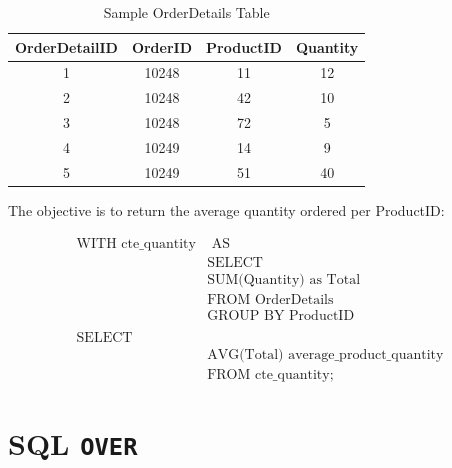 \documentclass{article}
\begin{document}
\begin{table}[h]
    \centering
    \begin{tabular}{|c|c|c|c|}
        \hline
        OrderDetailID & OrderID & ProductID & Quantity \\
        \hline
        1             & 10248   & 11        & 12       \\
        2             & 10248   & 42        & 10       \\
        3             & 10248   & 72        & 5        \\
        4             & 10249   & 14        & 9        \\
        5             & 10249   & 51        & 40       \\
        \hline
    \end{tabular}
    \caption{Sample OrderDetails Table}
\end{table}

The objective is to return the average quantity ordered per ProductID:

\begin{align*}
    \text{WITH cte\_quantity} & \text{ AS}                                   \\
                              & \text{SELECT}                                \\
                              & \text{SUM(Quantity) as Total}                \\
                              & \text{FROM OrderDetails}                     \\
                              & \text{GROUP BY ProductID}                    \\
                              &                                              \\
    \text{SELECT}                                                            \\
                              & \text{AVG(Total) average\_product\_quantity} \\
                              & \text{FROM cte\_quantity;}
\end{align*}

\section{SQL \texttt{OVER}}
\end{document}
